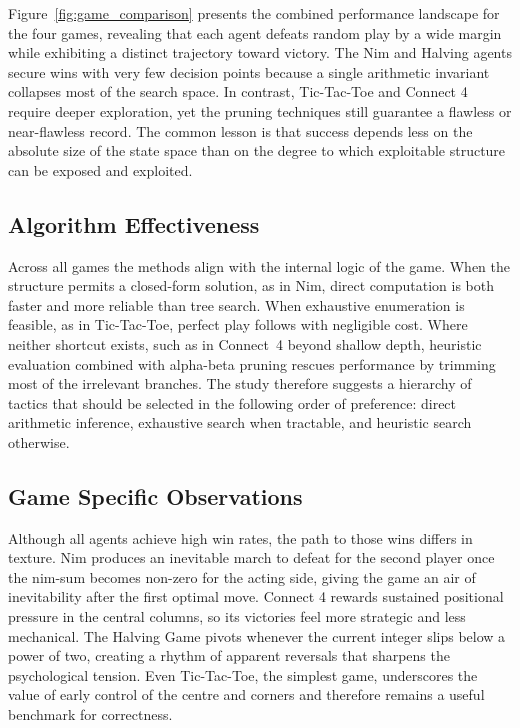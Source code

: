 \documentclass[12pt]{article}
\begin{document}
Figure~\ref{fig:game_comparison} presents the combined performance landscape for the four games, revealing that each agent defeats random play by a wide margin while exhibiting a distinct trajectory toward victory. The Nim and Halving agents secure wins with very few decision points because a single arithmetic invariant collapses most of the search space. In contrast, Tic-Tac-Toe and Connect 4 require deeper exploration, yet the pruning techniques still guarantee a flawless or near-flawless record. The common lesson is that success depends less on the absolute size of the state space than on the degree to which exploitable structure can be exposed and exploited.

\subsection{Algorithm Effectiveness}

Across all games the methods align with the internal logic of the game. When the structure permits a closed-form solution, as in Nim, direct computation is both faster and more reliable than tree search. When exhaustive enumeration is feasible, as in Tic-Tac-Toe, perfect play follows with negligible cost. Where neither shortcut exists, such as in Connect 4 beyond shallow depth, heuristic evaluation combined with alpha-beta pruning rescues performance by trimming most of the irrelevant branches. The study therefore suggests a hierarchy of tactics that should be selected in the following order of preference: direct arithmetic inference, exhaustive search when tractable, and heuristic search otherwise.

\subsection{Game Specific Observations}

Although all agents achieve high win rates, the path to those wins differs in texture. Nim produces an inevitable march to defeat for the second player once the nim-sum becomes non-zero for the acting side, giving the game an air of inevitability after the first optimal move. Connect 4 rewards sustained positional pressure in the central columns, so its victories feel more strategic and less mechanical. The Halving Game pivots whenever the current integer slips below a power of two, creating a rhythm of apparent reversals that sharpens the psychological tension. Even Tic-Tac-Toe, the simplest game, underscores the value of early control of the centre and corners and therefore remains a useful benchmark for correctness.
\end{document}
